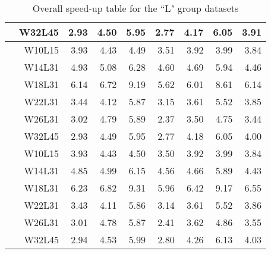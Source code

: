 \begin{table}[!ht]
\begin{tabular}{c r | rrr | rrrr}
		& W32L45 & 2.93 & 4.50 & 5.95 & 2.77 & 4.17 & 6.05 & 3.91 \\
		\midrule
		\multirow{6}{*}{\rotatebox[origin=c]{90}{\textbf{L2000000}}}
		& W10L15 & 3.93 & 4.43 & 4.49 & 3.51 & 3.92 & 3.99 & 3.84 \\
		& W14L31 & 4.93 & 5.08 & 6.28 & 4.60 & 4.69 & 5.94 & 4.46 \\
		& W18L31 & 6.14 & 6.72 & 9.19 & 5.62 & 6.01 & 8.61 & 6.14 \\
		& W22L31 & 3.44 & 4.12 & 5.87 & 3.15 & 3.61 & 5.52 & 3.85 \\
		& W26L31 & 3.02 & 4.79 & 5.89 & 2.37 & 3.50 & 4.75 & 3.44 \\
		& W32L45 & 2.93 & 4.49 & 5.95 & 2.77 & 4.18 & 6.05 & 4.00 \\
		\midrule
		\multirow{6}{*}{\rotatebox[origin=c]{90}{\textbf{L5000000}}}
		& W10L15 & 3.93 & 4.43 & 4.50 & 3.50 & 3.92 & 3.99 & 3.84 \\
		& W14L31 & 4.85 & 4.99 & 6.15 & 4.56 & 4.66 & 5.89 & 4.43 \\
		& W18L31 & 6.23 & 6.82 & 9.31 & 5.96 & 6.42 & 9.17 & 6.55 \\
		& W22L31 & 3.43 & 4.11 & 5.86 & 3.14 & 3.61 & 5.52 & 3.86 \\
		& W26L31 & 3.01 & 4.78 & 5.87 & 2.41 & 3.62 & 4.86 & 3.55 \\
		& W32L45 & 2.94 & 4.53 & 5.99 & 2.80 & 4.26 & 6.13 & 4.03 \\
		\bottomrule
	\end{tabular}
	\caption{Overall speed-up table for the “L" group datasets}
	\label{tab:speedup-gruppoL}
\end{table}
\clearpage

